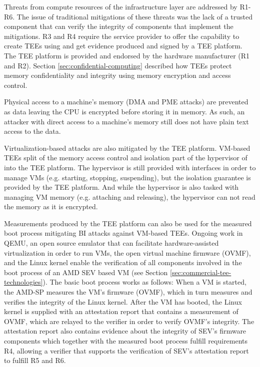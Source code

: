 Threats from compute resources of the infrastructure layer are addressed by
R1-R6. The issue of traditional mitigations of these threats was the lack of a
trusted component that can verify the integrity of components that implement the
mitigations. R3 and R4 require the service provider to offer the capability to
create TEEs using and get evidence produced and signed by a TEE platform. The
TEE platform is provided and endorsed by the hardware manufacturer (R1 and R2).
Section \ref{sec:confidential-computing} described how TEEs protect memory
confidentiality and integrity using memory encryption and access control.

Physical access to a machine's memory (DMA and PME attacks) are prevented as
data leaving the CPU is encrypted before storing it in memory. As such, an
attacker with direct access to a machine's memory still does not have plain text
access to the data.

Virtualization-based attacks are also mitigated by the TEE platform. VM-based
TEEs split of the memory access control and isolation part of the hypervisor of
into the TEE platform. The hypervisor is still provided with interfaces in order
to manage VMs (e.g. starting, stopping, suspending), but the isolation guarantee
is provided by the TEE platform. And while the hypervisor is also tasked with
managing VM memory (e.g. attaching and releasing), the hypervisor can not read
the memory as it is encrypted.

Measurements produced by the TEE platform can also be used for the measured boot
process mitigating BI attacks against VM-based TEEs. Ongoing work in QEMU, an
open source emulator that can facilitate hardware-assisted virtualization in
order to run VMs, the open virtual machine firmware (OVMF), and the Linux kernel
enable the verification of all components involved in the boot process of an AMD
SEV based VM (see Section \ref{sec:commercial-tee-technologies}). The basic boot
process works as follows: When a VM is started, the AMD-SP measures the VM's
firmware (OVMF), which in turn measures and verifies the integrity of the Linux
kernel. After the VM has booted, the Linux kernel is supplied with an
attestation report that contains a measurement of OVMF, which are relayed to the
verifier in order to verify OVMF's integrity. The attestation report also
contains evidence about the integrity of SEV's firmware components which
together with the measured boot process fulfill requirements R4, allowing a
verifier that supports the verification of SEV's attestation report to fulfill
R5 and R6.

